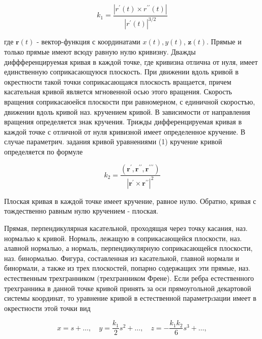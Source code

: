 \documentclass[10pt]{article}
\begin{document}
\[

k_{1}=\frac{\left|r^{\prime}(t) \times r^{\prime \prime}(t)\right|}{\left|r^{\prime}(t)\right|^{3 / 2}}

\]



где $\boldsymbol{r}(t)$ - вектор-функция с координатами $x(t), y(t)$, $\boldsymbol{z}(t)$. Прямые и только прямые имеют всюду равную нулю кривизну. Дважды диффференцируемая кривая в каждой точке, где кривизна отлична от нуля, имеет единственную соприкасающуюся плоскость. При движении вдоль кривой в окрестности такой точки соприкасающаяся плоскость вращается, причем касательная кривой является мгновенной осью этого вращения. Скорость вращения соприкасаюейся плоскости при равномерном, с единичной скоростъю, движении вдоль кривой наз. кручением кривой. В зависимости от направления вращения определяется знак кручения. Трижды дифференцируемая кривая в каждой точке с отличной от нуля кривизной имеет определенное кручение. В случае параметрич. задания кривой уравнениями (1) кручение кривой определяется по формуле



\[

k_{2}=\frac{\left(\boldsymbol{r}^{\prime}, \boldsymbol{r}^{\prime \prime}, \boldsymbol{r}^{\prime \prime \prime}\right)}{\left|\boldsymbol{r}^{\prime} \times \boldsymbol{r}^{\prime \prime}\right|^{2}}

\]



Плоская кривая в каждой точке имеет кручение, равное нулю. Обратно, кривая с тождественно равным нулю кручением - плоская.



Прямая, перпендикулярная касательной, проходящая через точку касания, наз. нормалью к кривой. Нормаль, лежащую в соприкасающейся плоскости, наз. алавной нормалью, а нормаль, перпендикулярную соприкасающейся плоскости, наз. бинормалью. Фигура, составленная из касательной, главной нормали и бинормали, а также из трех плоскостей, попарно содержащих эти прямые, наз. естественным трехгранником (трехгранником Френе). Если ребра естественного трехгранника в данной точке кривой принять за оси прямоугольной декартовой системы координат, то уравнение кривой в естественной параметрıзации имеет в окрестности этой точки вид



\[

x=s+\ldots, \quad y=\frac{k_{1}}{2} s^{2}+\ldots, \quad z=-\frac{k_{1} k_{2}}{6} s^{3}+\ldots,

\]
\end{document}
